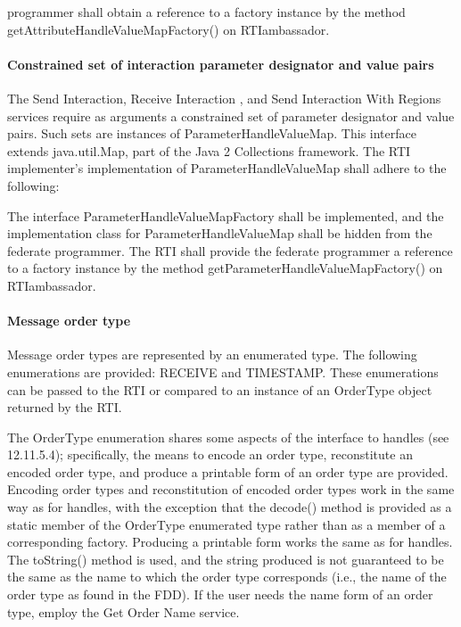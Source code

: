 \begin{compactstdpage}
    programmer shall obtain a reference to a factory instance by the method getAttributeHandleValueMapFactory() on RTIambassador.

    \paragraph{Constrained set of interaction parameter designator and value pairs}

    The Send Interaction, Receive Interaction \rtiinitiated{}, and Send Interaction With Regions services require as arguments a constrained set of parameter designator and value pairs. Such sets are instances of ParameterHandleValueMap. This interface extends java.util.Map, part of the Java 2 Collections framework. The RTI implementer's implementation of ParameterHandleValueMap shall adhere to the following:

    The interface ParameterHandleValueMapFactory shall be implemented, and the implementation class for ParameterHandleValueMap shall be hidden from the federate programmer. The RTI shall provide the federate programmer a reference to a factory instance by the method getParameterHandleValueMapFactory() on RTIambassador.

    \paragraph{Message order type}

    Message order types are represented by an enumerated type. The following enumerations are provided: RECEIVE and TIMESTAMP. These enumerations can be passed to the RTI or compared to an instance of an OrderType object returned by the RTI.

    The OrderType enumeration shares some aspects of the interface to handles (see 12.11.5.4); specifically, the means to encode an order type, reconstitute an encoded order type, and produce a printable form of an order type are provided. Encoding order types and reconstitution of encoded order types work in the same way as for handles, with the exception that the decode() method is provided as a static member of the OrderType enumerated type rather than as a member of a corresponding factory. Producing a printable form works the same as for handles. The toString() method is used, and the string produced is not guaranteed to be the same as the name to which the order type corresponds (i.e., the name of the order type as found in the FDD). If the user needs the name form of an order type, employ the Get Order Name service.


\end{compactstdpage}
